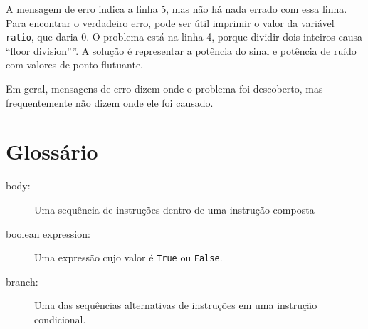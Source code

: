 {A mensagem de erro indica a linha 5, mas não há nada
errado com essa linha. Para encontrar o verdadeiro erro, pode ser
útil imprimir o valor da variável {\tt ratio}, que daria 
0. O problema está na linha 4, porque dividir dois inteiros
causa ``floor division''''. A solução é representar a potência do sinal
e potência de ruído com valores de ponto flutuante.



Em geral, mensagens de erro dizem onde o problema foi descoberto,
mas frequentemente não dizem onde ele foi causado.



\section{Glossário}

\begin{description}

\item[body:] Uma sequência de instruções dentro de uma instrução composta

\item[boolean expression:] Uma expressão cujo valor é
{\tt True} ou {\tt False}.

\item[branch:] Uma das sequências alternativas de instruções em uma 
instrução condicional.


\end{description}}

